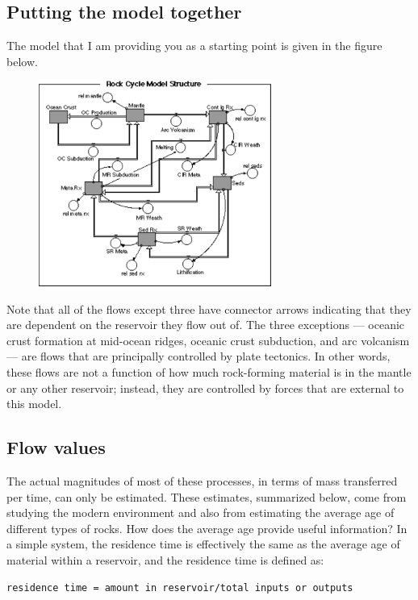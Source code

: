 \documentclass[11pt,letterpaper]{article}
\begin{document}
\subsection{Putting the model together}
The model that I am providing you as a starting point is given in the figure below.

\begin{figure}[h]
\includegraphics[width=3in]{./rcdiagram}
\end{figure}

Note that all of the flows except three have connector arrows indicating that they are dependent on the reservoir they flow out of. The three exceptions --- oceanic crust formation at mid-ocean ridges, oceanic crust subduction, and arc volcanism --- are flows that are principally controlled by plate tectonics. In other words, these flows are not a function of how much rock-forming material is in the mantle or any other reservoir; instead, they are controlled by forces that are external to this model.


\subsection{Flow values}
The actual magnitudes of most of these processes, in terms of mass transferred per time, can only be estimated. These estimates, summarized below, come from studying the modern environment and also from estimating the average age of different types of rocks. How does the average age provide useful information? In a simple system, the residence time is effectively the same as the average age of material within a reservoir, and the residence time is defined as:

\begin{verbatim}
residence time = amount in reservoir/total inputs or outputs
\end{verbatim}
\end{document}
